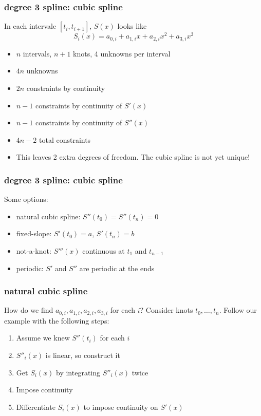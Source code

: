 \documentclass[10pt]{beamer}
\begin{document}
\begin{frame}
\frametitle{degree 3 spline: cubic spline}
In each intervale $[t_i,t_{i+1}]$, $S(x)$ looks like
\begin{equation*}
  S_i(x) = a_{0,i} + a_{1,i}x + a_{2,i}x^2 + a_{3,i}x^3
\end{equation*}
\begin{itemize}
  \item<1-> $n$ intervals, $n+1$ knots, 4 unknowns per interval
  \item<1-> $4n$ unknowns
  \item<2-> $2n$ constraints by continuity
  \item<3-> $n-1$ constraints by continuity of $S'(x)$
  \item<4-> $n-1$ constraints by continuity of $S''(x)$
  \item<5-> $4n-2$ total constraints
  \item<6-> This leaves 2 extra degrees of freedom.  The cubic spline is not yet
unique!
\end{itemize}
\end{frame}
\begin{frame}
\frametitle{degree 3 spline: cubic spline}
Some options:
  \begin{itemize}
    \item natural cubic spline: $S''(t_0)=S''(t_n)=0$
    \item fixed-slope: $S'(t_0)=a$, $S'(t_n)=b$
    \item not-a-knot: $S'''(x)$ continuous at $t_1$ and $t_{n-1}$
    \item periodic: $S'$ and $S''$ are periodic at the ends
  \end{itemize}
\end{frame}
\begin{frame}
\frametitle{natural cubic spline}
How do we find $a_{0,i}, a_{1,i}, a_{2,i}, a_{3,i}$ for each $i$?
\bigskip
Consider knots $t_0,\dots,t_n$.  Follow our example with the following
steps:
\begin{enumerate}
  \item Assume we knew $S''(t_i)$ for each $i$
  \item $S''_i(x)$ is linear, so construct it
  \item Get $S_i(x)$ by integrating $S''_i(x)$ twice
  \item Impose continuity
  \item Differentiate $S_i(x)$ to impose continuity on $S'(x)$
\end{enumerate}

\end{frame}
\end{document}
